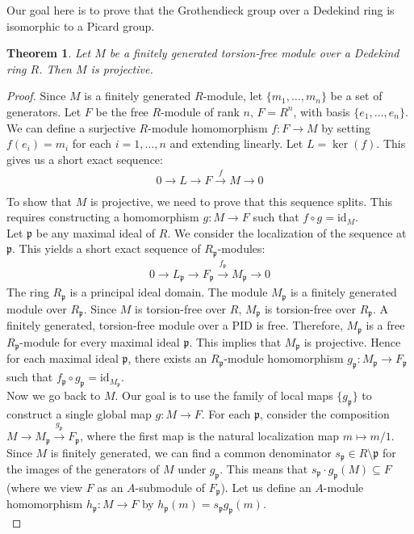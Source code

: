 \documentclass[12pt]{article}
\theoremstyle{plain}
\newtheorem{theorem}{Theorem}[section]
\theoremstyle{remark}
\theoremstyle{definition}
\begin{document}
Our goal here is to prove that the Grothendieck group over a Dedekind ring is isomorphic to a Picard group.

\begin{theorem}
    Let $M$ be a finitely generated torsion-free module over a Dedekind ring $R$. Then $M$ is projective.
\end{theorem}

\begin{proof}
    Since $M$ is a finitely generated $R$-module, let $\{m_1, \dots, m_n\}$ be a set of generators. Let $F$ be the free $R$-module of rank $n$, $F = R^n$, with basis $\{e_1, \dots, e_n\}$. We can define a surjective $R$-module homomorphism $f: F \to M$ by setting $f(e_i) = m_i$ for each $i=1, \dots, n$ and extending linearly. Let $L = \ker(f)$. This gives us a short exact sequence:
    \begin{align*}
        0\rightarrow L\rightarrow F\xrightarrow[]{f} M\rightarrow 0
    \end{align*}
    To show that $M$ is projective, we need to prove that this sequence splits. This requires constructing a homomorphism $g: M \to F$ such that $f \circ g = \mathrm{id}_M$. \\
    Let $\mathfrak{p}$ be any maximal ideal of $R$. We consider the localization of the sequence at $\mathfrak{p}$. This yields a short exact sequence of $R_\mathfrak{p}$-modules:
    \begin{align*}
        0 \to L_\mathfrak{p} \to F_\mathfrak{p} \xrightarrow{f_\mathfrak{p}} M_\mathfrak{p} \to 0
    \end{align*}
    The ring $R_\mathfrak{p}$ is a principal ideal domain. The module $M_\mathfrak{p}$ is a finitely generated module over $R_\mathfrak{p}$. Since $M$ is torsion-free over $R$, $M_\mathfrak{p}$ is torsion-free over $R_\mathfrak{p}$. A finitely generated, torsion-free module over a PID is free. Therefore, $M_\mathfrak{p}$ is a free $R_\mathfrak{p}$-module for every maximal ideal $\mathfrak{p}$. This implies that $M_\mathfrak{p}$ is projective. Hence for each maximal ideal $\mathfrak{p}$, there exists an $R_\mathfrak{p}$-module homomorphism $g_\mathfrak{p}: M_\mathfrak{p} \to F_\mathfrak{p}$ such that $f_\mathfrak{p} \circ g_\mathfrak{p} = \mathrm{id}_{M_\mathfrak{p}}$. \\
    Now we go back to $M$. Our goal is to use the family of local maps $\{g_\mathfrak{p}\}$ to construct a single global map $g: M \to F$. For each $\mathfrak{p}$, consider the composition $M \to M_\mathfrak{p} \xrightarrow{g_\mathfrak{p}} F_\mathfrak{p}$, where the first map is the natural localization map $m \mapsto m/1$. Since $M$ is finitely generated, we can find a common denominator $s_\mathfrak{p} \in R \setminus \mathfrak{p}$ for the images of the generators of $M$ under $g_\mathfrak{p}$. This means that $s_\mathfrak{p} \cdot g_\mathfrak{p}(M) \subseteq F$ (where we view $F$ as an $A$-submodule of $F_\mathfrak{p}$). Let us define an $A$-module homomorphism $h_\mathfrak{p}: M \to F$ by $h_\mathfrak{p}(m) = s_\mathfrak{p} g_\mathfrak{p}(m)$. \\

\end{proof}
\end{document}
